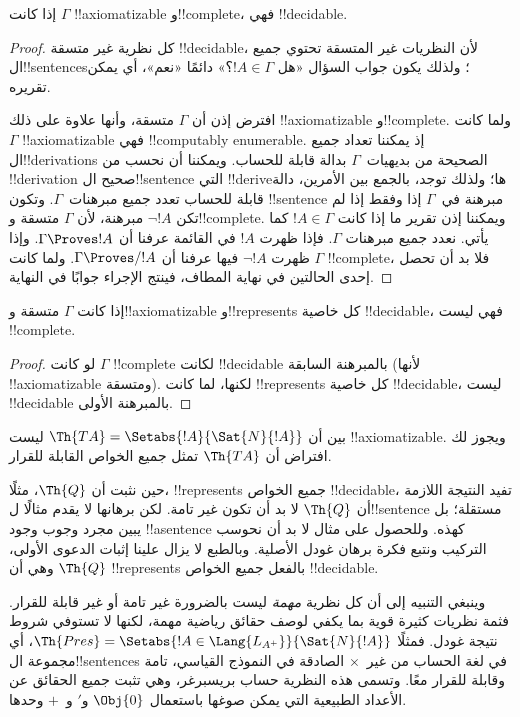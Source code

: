 \documentclass[../../../include/open-logic-section]{subfiles}
\begin{document}
\begin{thm}
إذا كانت $\Gamma$ !!{axiomatizable} و!!{complete}، فهي
!!{decidable}.
\end{thm}

\begin{proof}
كل نظرية غير متسقة !!{decidable}، لأن النظريات غير المتسقة تحتوي جميع
ال!!{sentence}s؛ ولذلك يكون جواب السؤال «هل $!A\in\Gamma$؟» دائمًا
«نعم»، أي يمكن تقريره.

افترض إذن أن $\Gamma$ متسقة، وأنها علاوة على ذلك !!{axiomatizable}
و!!{complete}. ولما كانت $\Gamma$ !!{axiomatizable} فهي
!!{computably enumerable}. إذ يمكننا تعداد جميع ال!!{derivation}s
الصحيحة من بديهيات~$\Gamma$ بدالة قابلة للحساب. ويمكننا أن نحسب من
!!{derivation} صحيح ال!!{sentence} التي !!{derive}ها؛ ولذلك توجد،
بالجمع بين الأمرين، دالة قابلة للحساب تعدد جميع مبرهنات~$\Gamma$.
وتكون !!{sentence} مبرهنة في~$\Gamma$ إذا وفقط إذا لم تكن
$\lnot !A$ مبرهنة، لأن $\Gamma$ متسقة و!!{complete}. ويمكننا إذن
تقرير ما إذا كانت $!A\in\Gamma$ كما يأتي. نعدد جميع مبرهنات
$\Gamma$. فإذا ظهرت $!A$ في القائمة عرفنا أن
$\Gamma\Proves !A$. وإذا ظهرت $\lnot !A$ فيها عرفنا أن
$\Gamma\Proves/ !A$. ولما كانت $\Gamma$ !!{complete}، فلا بد أن
تحصل إحدى الحالتين في نهاية المطاف، فينتج الإجراء جوابًا في النهاية.
\end{proof}

\begin{cor}
إذا كانت $\Gamma$ متسقة و!!{axiomatizable} و!!{represents} كل خاصية
!!{decidable}، فهي ليست !!{complete}.
\end{cor}

\begin{proof}
لو كانت $\Gamma$ !!{complete} لكانت !!{decidable} بالمبرهنة السابقة
(لأنها !!{axiomatizable} ومتسقة). لكنها، لما كانت !!{represents} كل
خاصية !!{decidable}، ليست !!{decidable} بالمبرهنة الأولى.
\end{proof}

\begin{prob}
بين أن $\Th{TA}=\Setabs{!A}{\Sat{N}{!A}}$ ليست
!!{axiomatizable}. ويجوز لك افتراض أن $\Th{TA}$ تمثل جميع الخواص
القابلة للقرار.
\end{prob}

حين نثبت أن $\Th{Q}$، مثلًا، !!{represents} جميع الخواص
!!{decidable}، تفيد النتيجة اللازمة أن $\Th{Q}$ لا بد أن تكون غير
تامة. لكن برهانها لا يقدم مثالًا ل!!{sentence} مستقلة؛ بل يبين مجرد
وجوب وجود !!a{sentence} كهذه. وللحصول على مثال لا بد أن نحوسب
التركيب ونتبع فكرة برهان غودل الأصلية. وبالطبع لا يزال علينا إثبات
الدعوى الأولى، وهي أن $\Th{Q}$ !!{represents} بالفعل جميع الخواص
!!{decidable}.

وينبغي التنبيه إلى أن كل نظرية \emph{مهمة} ليست بالضرورة غير تامة
أو غير قابلة للقرار. فثمة نظريات كثيرة قوية بما يكفي لوصف حقائق
رياضية مهمة، لكنها لا تستوفي شروط نتيجة غودل. فمثلًا
$\Th{Pres}=\Setabs{!A\in\Lang{L_{A^+}}}{\Sat{N}{!A}}$، أي مجموعة
ال!!{sentence}s في لغة الحساب من غير~$\times$ الصادقة في النموذج
القياسي، تامة وقابلة للقرار معًا. وتسمى هذه النظرية حساب بريسبرغر،
وهي تثبت جميع الحقائق عن الأعداد الطبيعية التي يمكن صوغها باستعمال
$\Obj{0}$ و$\prime$ و~$+$ وحدها.
\end{document}
